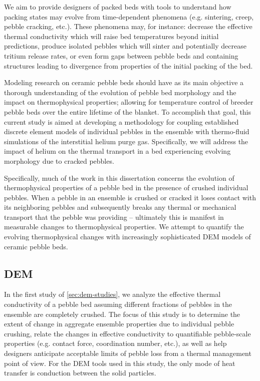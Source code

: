 We aim to provide designers of packed beds with tools to understand how packing states may evolve from time-dependent phenomena (e.g. sintering, creep, pebble cracking, etc.). These phenomena may, for instance: decrease the effective thermal conductivity which will raise bed temperatures beyond initial predictions, produce isolated pebbles which will sinter and potentially decrease tritium release rates, or even form gaps between pebble beds and containing structures leading to divergence from properties of the initial packing of the bed.

Modeling research on ceramic pebble beds should have as its main objective a thorough understanding of the evolution of pebble bed morphology and the impact on thermophysical properties; allowing for temperature control of breeder pebble beds over the entire lifetime of the blanket. To accomplish that goal, this current study is aimed at developing a methodology for coupling established discrete element models of individual pebbles in the ensemble with thermo-fluid simulations of the interstitial helium purge gas. Specifically, we will address the impact of helium on the thermal transport in a bed experiencing evolving morphology due to cracked pebbles.

Specifically, much of the work in this dissertation concerns the evolution of thermophysical properties of a pebble bed in the presence of crushed individual pebbles. When a pebble in an ensemble is crushed or cracked it loses contact with its neighboring pebbles and subsequently breaks any thermal or mechanical transport that the pebble was providing -- ultimately this is manifest in measurable changes to thermophysical properties. We attempt to quantify the evolving thermophysical changes with increasingly sophisticated DEM models of ceramic pebble beds.


\subsection{DEM}
In the first study of \cref{sec:dem-studies}, we analyze the effective thermal conductivity of a pebble bed assuming different fractions of pebbles in the ensemble are completely crushed. The focus of this study is to determine the extent of change in aggregate ensemble properties due to individual pebble crushing, relate the changes in effective conductivity to quantifiable pebble-scale properties (e.g. contact force, coordination number, etc.), as well as help designers anticipate acceptable limits of pebble loss from a thermal management point of view. For the DEM tools used in this study, the only mode of heat transfer is conduction between the solid particles. 




